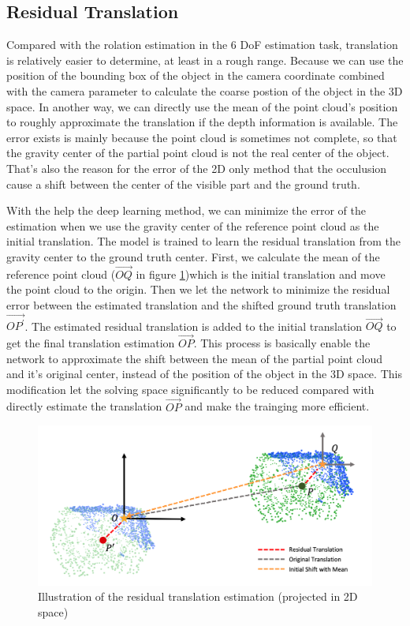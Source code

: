 \documentclass[12pt,DIV14,BCOR12mm,a4paper,footinclude=false,headinclude,parskip=half-,twoside,openright,cleardoublepage=empty,toc=index,bibliography=totoc,listof=totoc]{scrreprt}
\numberwithin{equation}{chapter}
\begin{document}
\subsection{Residual Translation}
Compared with the rolation estimation in the 6 DoF estimation task, translation is relatively easier to determine, at least in a rough range. Because we can use the position of the bounding box of the object in the camera coordinate combined with the camera parameter to calculate the coarse postion of the object in the 3D space. In another way, we can directly use the mean of the point cloud's position to roughly approximate the translation if the depth information is available. The error exists is mainly because the point cloud is sometimes not complete, so that the gravity center of the partial point cloud is not the real center of the object. That's also the reason for the error of the 2D only method that the occulusion cause a shift between the center of the visible part and the ground truth.

With the help the deep learning method, we can minimize the error of the estimation when we use the gravity center of the reference point cloud as the initial translation. The model is trained to learn the residual translation from the gravity center to the ground truth center. First, we calculate the mean of the reference point cloud ($\overrightarrow{OQ}$ in figure \ref{img:res_t})which is the initial translation and move the point cloud to the origin. Then we let the network to minimize the residual error between the estimated translation and the shifted ground truth translation $\overrightarrow{OP^{'}}$. The estimated residual translation is added to the initial translation $\overrightarrow{OQ}$ to get the final translation estimation $\overrightarrow{OP} $. This process is basically enable the network to approximate the shift between the mean of the partial point cloud and it's original center, instead of the position of the object in the 3D space. This modification let the solving space significantly to be reduced compared with directly estimate the translation $\overrightarrow{OP} $ and make the trainging more efficient.

\begin{figure}[h]
	\centering
	\includegraphics[scale=.22]{img/res_t.png}
	\caption{Illustration of the residual translation estimation (projected in 2D space)}
	\label{img:res_t}
\end{figure}
\end{document}
